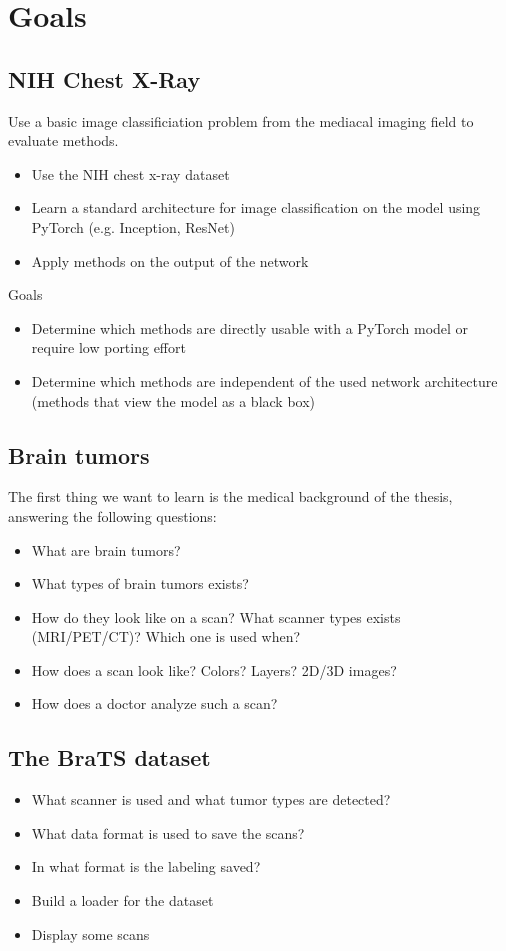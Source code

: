 \chapter*{Goals}

\section*{NIH Chest X-Ray}
Use a basic image classificiation problem from the mediacal imaging field to evaluate methods.
\begin{itemize}
    \item Use the NIH chest x-ray dataset
    \item Learn a standard architecture for image classification on the model using PyTorch (e.g. Inception, ResNet)
    \item Apply methods on the output of the network
\end{itemize}
Goals
\begin{itemize}
    \item Determine which methods are directly usable with a PyTorch model or require low porting effort
    \item Determine which methods are independent of the used network architecture (methods that view the model as a black box)
\end{itemize}

\section*{Brain tumors}
The first thing we want to learn is the medical background of the thesis, answering the following questions:
\begin{itemize}
    \item What are brain tumors?
    \item What types of brain tumors exists?
    \item How do they look like on a scan? What scanner types exists (MRI/PET/CT)? Which one is used when?
    \item How does a scan look like? Colors? Layers? 2D/3D images?
    \item How does a doctor analyze such a scan?
\end{itemize}

\section*{The BraTS dataset}
\begin{itemize}
    \item What scanner is used and what tumor types are detected?
    \item What data format is used to save the scans?
    \item In what format is the labeling saved?
    \item Build a loader for the dataset
    \item Display some scans
\end{itemize}

